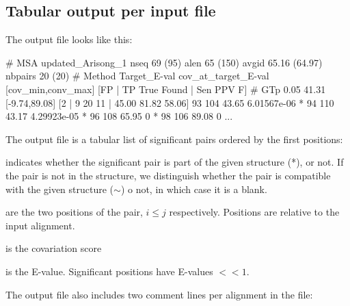 
 \subsection{Tabular output per input file}

 The output file  looks like this:

 \begin{sreoutput}
 # MSA updated_Arisong_1 nseq 69 (95) alen 65 (150) avgid 65.16 (64.97) nbpairs 20 (20)
 # Method Target_E-val cov_at_target_E-val [cov_min,conv_max] [FP | TP True Found | Sen PPV F] 
 # GTp    0.05         41.31               [-9.74,89.08]     [2 | 9 20 11 | 45.00 81.82 58.06] 
                 93             104      43.65   6.01567e-06
 *               94             110      43.17   4.29923e-05
 *               96             108      65.95   0
 *               98             106      89.08   0
 ...
 \end{sreoutput}
 The output file is a tabular list of significant pairs ordered by the first positions:

 \begin{sreitems}{}
 \item[\prog{First column}] indicates whether the significant pair is
   part of the given structure (*), or not.  If the pair is not in the
   structure, we distinguish whether the pair is compatible with the
   given structure ($\sim$) o not, in which case it is a blank.

 \item[\prog{Second and third columns}] are the two positions of the
   pair, $i\leq j$ respectively. Positions are relative to the input
   alignment.

 \item[\prog{Forth column}] is the covariation score

 \item[\prog{Fifth column}] is the E-value. Significant positions
   have E-values $<< 1$.
 \end{sreitems}
 The output file also includes two comment lines per alignment in the
 file:

